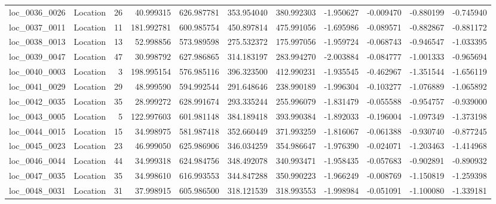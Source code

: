 \begin{tabular}{llrrrrrrrrr}
loc_0036_0026 &        Location &              26 &  40.999315 & 626.987781 &  353.954040 &    380.992303 &  -1.950627 &  -0.009470 &   -0.880199 &     -0.745940 \\
loc_0037_0011 &        Location &              11 & 181.992781 & 600.985754 &  450.897814 &    475.991056 &  -1.695986 &  -0.089571 &   -0.882867 &     -0.881172 \\
loc_0038_0013 &        Location &              13 &  52.998856 & 573.989598 &  275.532372 &    175.997056 &  -1.959724 &  -0.068743 &   -0.946547 &     -1.033395 \\
loc_0039_0047 &        Location &              47 &  30.998792 & 627.986865 &  314.183197 &    283.994270 &  -2.003884 &  -0.084777 &   -1.001333 &     -0.965694 \\
loc_0040_0003 &        Location &               3 & 198.995154 & 576.985116 &  396.323500 &    412.990231 &  -1.935545 &  -0.462967 &   -1.351544 &     -1.656119 \\
loc_0041_0029 &        Location &              29 &  48.999590 & 594.992544 &  291.648646 &    238.990189 &  -1.996304 &  -0.103277 &   -1.076889 &     -1.065892 \\
loc_0042_0035 &        Location &              35 &  28.999272 & 628.991674 &  293.335244 &    255.996079 &  -1.831479 &  -0.055588 &   -0.954757 &     -0.939000 \\
loc_0043_0005 &        Location &               5 & 122.997603 & 601.981148 &  384.189418 &    393.990384 &  -1.892033 &  -0.196004 &   -1.097349 &     -1.373198 \\
loc_0044_0015 &        Location &              15 &  34.998975 & 581.987418 &  352.660449 &    371.993259 &  -1.816067 &  -0.061388 &   -0.930740 &     -0.877245 \\
loc_0045_0023 &        Location &              23 &  46.999050 & 625.986906 &  346.034259 &    354.986647 &  -1.976390 &  -0.024071 &   -1.203463 &     -1.414968 \\
loc_0046_0044 &        Location &              44 &  34.999318 & 624.984756 &  348.492078 &    340.993471 &  -1.958435 &  -0.057683 &   -0.902891 &     -0.890932 \\
loc_0047_0035 &        Location &              35 &  34.998610 & 616.993553 &  344.847288 &    350.990223 &  -1.966249 &  -0.008769 &   -1.150819 &     -1.259398 \\
loc_0048_0031 &        Location &              31 &  37.998915 & 605.986500 &  318.121539 &    318.993553 &  -1.998984 &  -0.051091 &   -1.100080 &     -1.339181 \\

\end{tabular}
